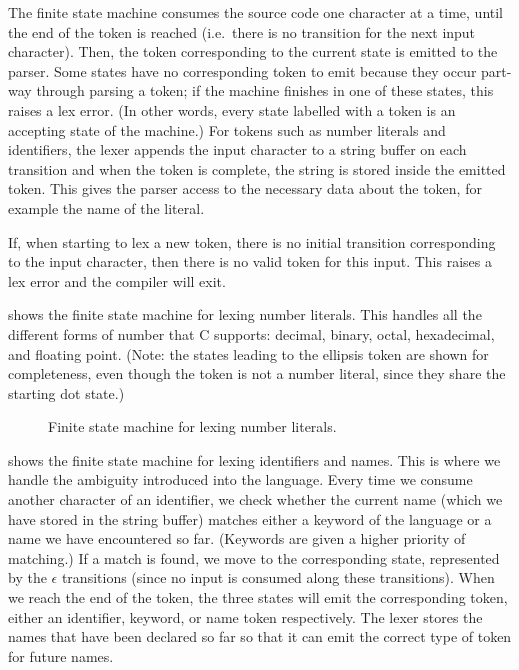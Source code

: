 \documentclass[00-main.tex]{subfiles}
\begin{document}
The finite state machine consumes the source code one character at a time, until the end of the token is reached (i.e.\ there is no transition for the next input character).
Then, the token corresponding to the current state is emitted to the parser.
Some states have no corresponding token to emit because they occur part-way through parsing a token; if the machine finishes in one of these states, this raises a lex error.
(In other words, every state labelled with a token is an accepting state of the machine.)
For tokens such as number literals and identifiers, the lexer appends the input character to a string buffer on each transition and when the token is complete, the string is stored inside the emitted token.
This gives the parser access to the necessary data about the token, for example the name of the literal.

If, when starting to lex a new token, there is no initial transition corresponding to the input character, then there is no valid token for this input. This raises a lex error and the compiler will exit.

 shows the finite state machine for lexing number literals. This handles all the different forms of number that C supports: decimal, binary, octal, hexadecimal, and floating point.
(Note: the states leading to the ellipsis token are shown for completeness, even though the token is not a number literal, since they share the starting dot state.)

\begin{figure}[!htb]
  \centering
  \caption{Finite state machine for lexing number literals.}
  \label{fig:lexing numbers fsm}
\end{figure}

 shows the finite state machine for lexing identifiers and  names.
This is where we handle the ambiguity introduced into the language.
  Every time we consume another character of an identifier, we check whether the current name (which we have stored in the string buffer) matches either a keyword of the language or a  name we have encountered so far.
(Keywords are given a higher priority of matching.)
  If a match is found, we move to the corresponding state, represented by the $\epsilon$ transitions (since no input is consumed along these transitions).
When we reach the end of the token, the three states will emit the corresponding token, either an identifier, keyword, or  name token respectively.
The lexer stores the  names that have been declared so far so that it can emit the correct type of token for future names.
\end{document}
